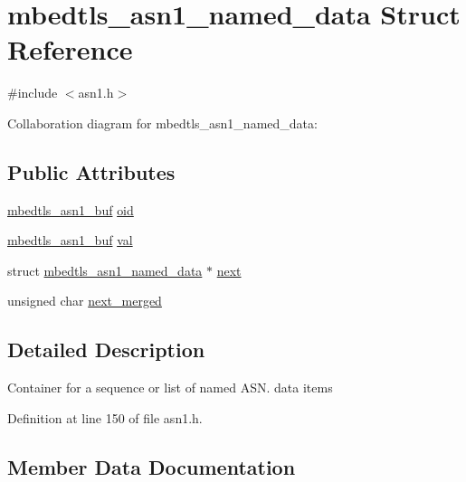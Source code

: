 \hypertarget{structmbedtls__asn1__named__data}{}\section{mbedtls\+\_\+asn1\+\_\+named\+\_\+data Struct Reference}
\label{structmbedtls__asn1__named__data}


{\ttfamily \#include $<$asn1.\+h$>$}



Collaboration diagram for mbedtls\+\_\+asn1\+\_\+named\+\_\+data\+:
\subsection*{Public Attributes}
\begin{DoxyCompactItemize}
\item 
\mbox{\hyperlink{structmbedtls__asn1__buf}{mbedtls\+\_\+asn1\+\_\+buf}} \mbox{\hyperlink{structmbedtls__asn1__named__data_a0981fcdac0ce14b6922a953adf0624d9}{oid}}
\item 
\mbox{\hyperlink{structmbedtls__asn1__buf}{mbedtls\+\_\+asn1\+\_\+buf}} \mbox{\hyperlink{structmbedtls__asn1__named__data_ad99636f90fae31a96c26df85a7896b07}{val}}
\item 
struct \mbox{\hyperlink{structmbedtls__asn1__named__data}{mbedtls\+\_\+asn1\+\_\+named\+\_\+data}} $\ast$ \mbox{\hyperlink{structmbedtls__asn1__named__data_a38f29c37c55319b3c0a9c998c3e5bd0d}{next}}
\item 
unsigned char \mbox{\hyperlink{structmbedtls__asn1__named__data_aee15b65458fa2c10596ff7c210ba4ee1}{next\+\_\+merged}}
\end{DoxyCompactItemize}


\subsection{Detailed Description}
Container for a sequence or list of \textquotesingle{}named\textquotesingle{} A\+S\+N. data items 

Definition at line 150 of file asn1.\+h.



\subsection{Member Data Documentation}
\mbox{\label{structmbedtls__asn1__named__data_a38f29c37c55319b3c0a9c998c3e5bd0d}} 
